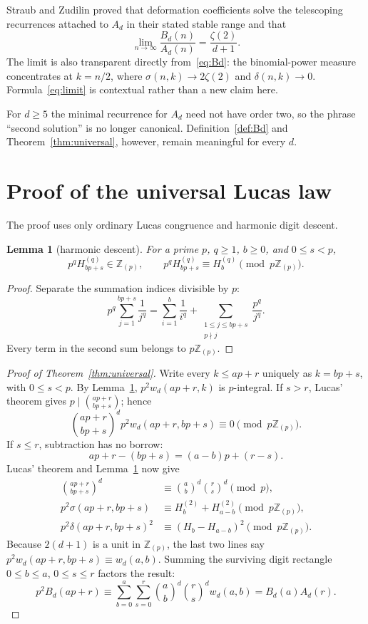\documentclass[11pt,reqno]{amsart}
\newtheorem{lemma}[theorem]{Lemma}
\theoremstyle{definition}
\theoremstyle{remark}
\newcommand{\Zp}{\mathbb Z_{(p)}}
\begin{document}
Straub and Zudilin proved that deformation coefficients solve the telescoping
recurrences attached to $A_d$ in their stated stable range and that
\begin{equation}\label{eq:limit}
 \lim_{n\to\infty}\frac{B_d(n)}{A_d(n)}=\frac{\zeta(2)}{d+1}.
\end{equation}
The limit is also transparent directly from~\eqref{eq:Bd}: the binomial-power
measure concentrates at $k=n/2$, where $\sigma(n,k)\to2\zeta(2)$ and
$\delta(n,k)\to0$.  Formula~\eqref{eq:limit} is contextual rather than a new
claim here.

For $d\geq5$ the minimal recurrence for $A_d$ need not have order two, so the
phrase ``second solution'' is no longer canonical.  Definition~\ref{def:Bd}
and Theorem~\ref{thm:universal}, however, remain meaningful for every $d$.

\section{Proof of the universal Lucas law}

The proof uses only ordinary Lucas congruence and harmonic digit descent.

\begin{lemma}[harmonic descent]\label{lem:harmonic}
For a prime $p$, $q\geq1$, $b\geq0$, and $0\leq s<p$,
\begin{equation}\label{eq:hdesc}
 p^q H_{bp+s}^{(q)}\in\Zp,
 \qquad p^q H_{bp+s}^{(q)}\equiv H_b^{(q)}\pmod {p\Zp}.
\end{equation}
\end{lemma}

\begin{proof}
Separate the summation indices divisible by $p$:
\[
 p^q\sum_{j=1}^{bp+s}\frac1{j^q}
 =\sum_{i=1}^b\frac1{i^q}
  +\sum_{\substack{1\leq j\leq bp+s\\p\nmid j}}\frac{p^q}{j^q}.
\]
Every term in the second sum belongs to $p\Zp$.
\end{proof}

\begin{proof}[Proof of Theorem~\ref{thm:universal}]
Write every $k\leq ap+r$ uniquely as $k=bp+s$, with $0\leq s<p$.
By Lemma~\ref{lem:harmonic}, $p^2w_d(ap+r,k)$ is $p$-integral.  If $s>r$,
Lucas' theorem gives $p\mid\binom{ap+r}{bp+s}$; hence
\[
 \binom{ap+r}{bp+s}^{d}p^2w_d(ap+r,bp+s)\equiv0\pmod {p\Zp}.
\]
If $s\leq r$, subtraction has no borrow:
\[
 ap+r-(bp+s)=(a-b)p+(r-s).
\]
Lucas' theorem and Lemma~\ref{lem:harmonic} now give
\begin{align*}
 \binom{ap+r}{bp+s}^{d}&\equiv\binom ab^d\binom rs^d\pmod p,\\
 p^2\sigma(ap+r,bp+s)&\equiv H_b^{(2)}+H_{a-b}^{(2)}\pmod {p\Zp},\\
 p^2\delta(ap+r,bp+s)^2&\equiv(H_b-H_{a-b})^2\pmod {p\Zp}.
\end{align*}
Because $2(d+1)$ is a unit in $\Zp$, the last two lines say
$p^2w_d(ap+r,bp+s)\equiv w_d(a,b)$.  Summing the surviving digit rectangle
$0\leq b\leq a$, $0\leq s\leq r$ factors the result:
\[
 p^2B_d(ap+r)\equiv
 \sum_{b=0}^a\sum_{s=0}^r\binom ab^d\binom rs^d w_d(a,b)
 =B_d(a)A_d(r).
\]
\end{proof}
\end{document}
